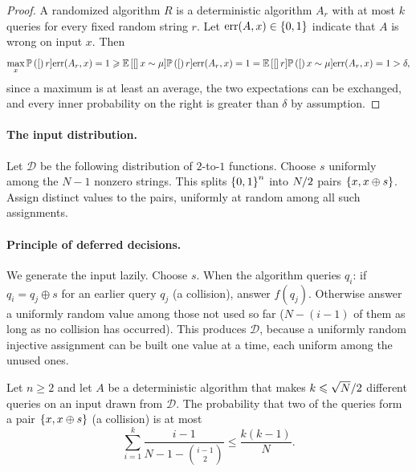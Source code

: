 \begin{proof}
    A randomized algorithm $R$ is a deterministic algorithm $A_r$ with at most $k$ queries for every
    fixed random string $r$. Let $\mathrm{err}(A, x) \in \left\lbrace0, 1\right\rbrace$ indicate that $A$ is wrong on
    input $x$. Then
    \[\max_{x} \operatorname{\mathbb{P}}\left([\right)r]{\mathrm{err}(A_r, x) = 1}
        \geqslant \operatorname{\mathbb{E}}\left[[\right]x \sim \mu]{\operatorname{\mathbb{P}}\left([\right)r]{\mathrm{err}(A_r, x) = 1}}
        = \operatorname{\mathbb{E}}\left[[\right]r]{\operatorname{\mathbb{P}}\left([\right)x \sim \mu]{\mathrm{err}(A_r, x) = 1}}
        > \delta,\]
    since a maximum is at least an average, the two expectations can be exchanged, and every inner
    probability on the right is greater than $\delta$ by assumption.
\end{proof}

\paragraph{The input distribution.} Let $\mathcal{D}$ be the following distribution of $2$-to-$1$
functions. Choose $s$ uniformly among the $N - 1$ nonzero strings. This splits $\left\lbrace0,1\right\rbrace^n$ into
$N/2$ pairs $\left\lbrace x, x \oplus s\right\rbrace$. Assign distinct values to the pairs, uniformly at
random among all such assignments.

\paragraph{Principle of deferred decisions.} We generate the input lazily. Choose $s$. When the
algorithm queries $q_i$: if $q_i = q_j \oplus s$ for an earlier query $q_j$ (a collision), answer
$f(q_j)$. Otherwise answer a uniformly random value among those not used so far ($N - (i-1)$ of them
as long as no collision has occurred). This produces $\mathcal{D}$, because a uniformly random
injective assignment can be built one value at a time, each uniform among the unused ones.

\begin{lemma}\label{lem:collision-1001}
    Let $n \geq 2$ and let $A$ be a deterministic algorithm that makes $k \leqslant \sqrt{N}/2$
    different queries on an input drawn from $\mathcal{D}$. The probability that two of the queries
    form a pair $\left\lbrace x, x \oplus s\right\rbrace$ (a collision) is at most
    \[\sum_{i=1}^{k} \frac{i-1}{N - 1 - \binom{i-1}{2}} \leq \frac{k(k-1)}{N}.\]
\end{lemma}

